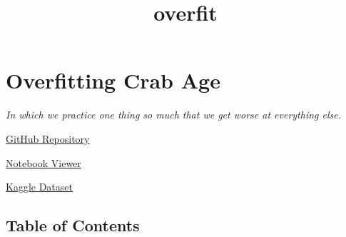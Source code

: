 \documentclass[11pt]{article}
\title{overfit}
\begin{document}
    
    \maketitle
    
    

    
    \section{Overfitting Crab Age}\label{overfitting-crab-age}

\emph{In which we practice one thing so much that we get worse at
everything else.}

\href{https://github.com/ahester57/ai_workshop/tree/master/notebooks/time_for_crab/0-eda}{GitHub
Repository}

\href{https://nbviewer.jupyter.org/github/ahester57/ai_workshop/blob/master/notebooks/time_for_crab/0-eda/overfit.ipynb}{Notebook
Viewer}

\href{https://www.kaggle.com/sidhus/crab-age-prediction}{Kaggle Dataset}

    \subsection{Table of Contents}\label{table-of-contents}
\end{document}
